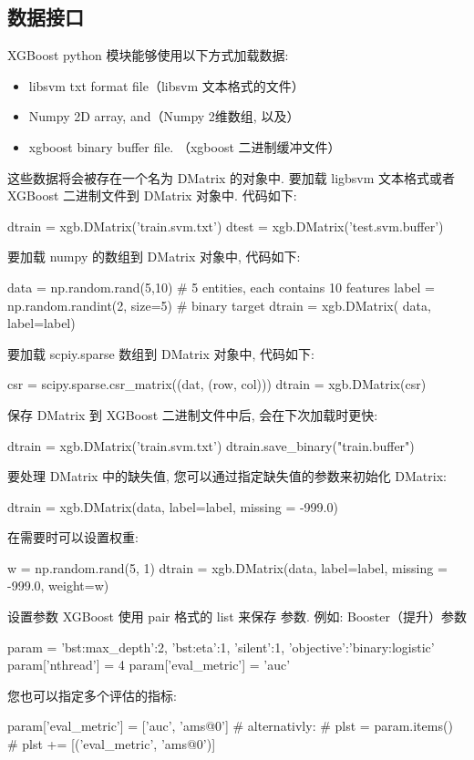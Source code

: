 \documentclass{article}
\newenvironment{python}{\VerbatimEnvironment\begin{pythoncode}}{\end{pythoncode}}
\begin{document}
\subsection{数据接口}
XGBoost python 模块能够使用以下方式加载数据:
\begin{itemize}
\item libsvm txt format file（libsvm 文本格式的文件）
\item Numpy 2D array, and（Numpy 2维数组, 以及）
\item xgboost binary buffer file. （xgboost 二进制缓冲文件）
\end{itemize}
这些数据将会被存在一个名为 DMatrix 的对象中.
要加载 ligbsvm 文本格式或者 XGBoost 二进制文件到 DMatrix 对象中. 代码如下:
\begin{python}
dtrain = xgb.DMatrix('train.svm.txt')
dtest = xgb.DMatrix('test.svm.buffer')
\end{python}
要加载 numpy 的数组到 DMatrix 对象中, 代码如下:
\begin{python}
data = np.random.rand(5,10) # 5 entities, each contains 10 features
label = np.random.randint(2, size=5) # binary target
dtrain = xgb.DMatrix( data, label=label)
\end{python}
要加载 scpiy.sparse 数组到 DMatrix 对象中, 代码如下:
\begin{python}
csr = scipy.sparse.csr_matrix((dat, (row, col)))
dtrain = xgb.DMatrix(csr)
\end{python}
保存 DMatrix 到 XGBoost 二进制文件中后, 会在下次加载时更快:
\begin{python}
dtrain = xgb.DMatrix('train.svm.txt')
dtrain.save_binary("train.buffer")
\end{python}
要处理 DMatrix 中的缺失值, 您可以通过指定缺失值的参数来初始化 DMatrix:
\begin{python}
dtrain = xgb.DMatrix(data, label=label, missing = -999.0)
\end{python}
在需要时可以设置权重:
\begin{python}
w = np.random.rand(5, 1)
dtrain = xgb.DMatrix(data, label=label, missing = -999.0, weight=w)
\end{python}
设置参数
XGBoost 使用 pair 格式的 list 来保存 参数. 例如:
Booster（提升）参数
\begin{python}
param = {'bst:max_depth':2, 'bst:eta':1, 'silent':1, 'objective':'binary:logistic' }
param['nthread'] = 4
param['eval_metric'] = 'auc'
\end{python}
您也可以指定多个评估的指标:
\begin{python}
param['eval_metric'] = ['auc', 'ams@0'] 
# alternativly:
# plst = param.items()
# plst += [('eval_metric', 'ams@0')]
\end{python}
\end{document}
